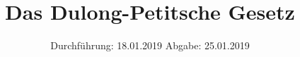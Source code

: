 

\subject{V201}
\title{Das Dulong-Petitsche Gesetz}
\date{
  Durchführung: 18.01.2019
  \hspace{3em}
  Abgabe: 25.01.2019
}



\maketitle
\thispagestyle{empty}
\tableofcontents
\newpage


%

 
 


\printbibliography{}

